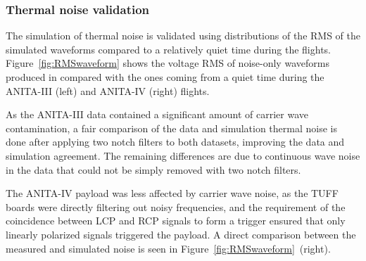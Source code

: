\subsubsection{Thermal noise validation}
\label{subsec:ANITA_validation_thermalNoise}
The simulation of thermal noise is validated using distributions of
the RMS of the simulated waveforms compared to a relatively quiet time
during the flights.
Figure~\ref{fig:RMSwaveform} shows the voltage RMS of noise-only waveforms produced
in \icemc compared with the ones coming from a quiet time during
the ANITA-III (left) and ANITA-IV (right) flights.

As the ANITA-III data contained a significant amount of carrier wave
contamination, a fair comparison of the data and simulation thermal noise is done after applying two notch filters to both datasets, improving the data and simulation agreement.
The remaining differences are due to continuous wave noise in the data that
could not be simply removed with two notch filters.

The ANITA-IV payload was less affected by carrier wave noise, as the TUFF boards were directly filtering out noisy frequencies, and the requirement of the coincidence between LCP and RCP signals to form a trigger ensured that only linearly polarized signals triggered the payload.
A direct comparison between the measured and simulated noise is seen in Figure~\ref{fig:RMSwaveform}~(right). 

